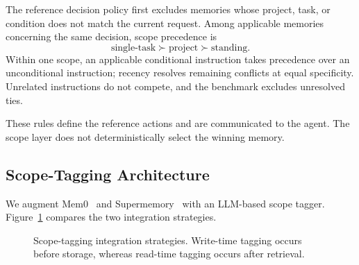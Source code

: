 \documentclass[11pt,a4paper]{article}
\begin{document}
The reference decision policy first excludes memories whose
project, task, or condition does not match the current request.
Among applicable memories concerning the same decision, scope
precedence is
\[
\text{single-task} \succ \text{project}
\succ \text{standing}.
\]
Within one scope, an applicable conditional instruction takes
precedence over an unconditional instruction; recency resolves
remaining conflicts at equal specificity. Unrelated instructions
do not compete, and the benchmark excludes unresolved ties.

These rules define the reference actions and are communicated
to the agent. The scope layer does not deterministically
select the winning memory.

\subsection{Scope-Tagging Architecture}
\label{sec:architecture}

We augment Mem0~\cite{chhikara2025mem0} and
Supermemory~\cite{supermemoryresearch} with an LLM-based
scope tagger. Figure~\ref{fig:architecture} compares the
two integration strategies.


\begin{figure}[htbp]
\centering
{}
\caption{Scope-tagging integration strategies.
Write-time tagging occurs before storage, whereas
read-time tagging occurs after retrieval.}
\label{fig:architecture}
\end{figure}
\end{document}
